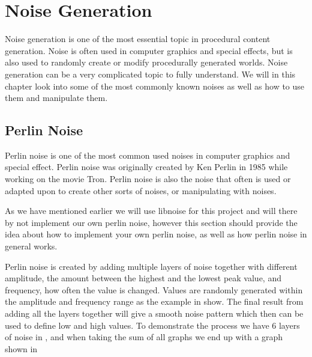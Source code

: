 \chapter{Noise Generation}
\label{NoiseGen}
Noise generation is one of the most essential topic in procedural content generation. Noise is often used in computer graphics and special effects, but is also used to randomly create or modify procedurally generated worlds. Noise generation can be a very complicated topic to fully understand. We will in this chapter look into some of the most commonly known noises as well as how to use them and manipulate them.


\section{Perlin Noise}

Perlin noise is one of the most common used noises in computer graphics and special effect. Perlin noise was originally created by Ken Perlin\cite{KenPerlin} in 1985 while working on the movie Tron\cite{perlinnoise}. Perlin noise is also the noise that often is used or adapted upon to create other sorts of noises, or manipulating with noises.

As we have mentioned earlier we will use libnoise for this project and will there by not implement our own perlin noise, however this section should provide the idea about how to implement your own perlin noise, as well as how perlin noise in general works.

Perlin noise is created by adding multiple layers of noise together with different amplitude, the amount between the highest and the lowest peak value, and frequency, how often the value is changed\cite{perlinnoise2}. Values are randomly generated within the amplitude and frequency range as the example in  show. The final result from adding all the layers together will give a smooth noise pattern which then can be used to define low and high values\cite{NoiseMachineMakingNoise}. To demonstrate the process we have 6 layers of noise in , and when taking the sum of all graphs we end up with a graph shown in 

